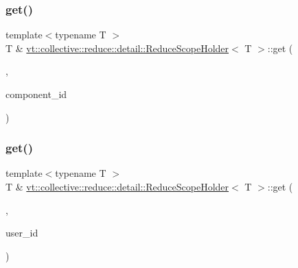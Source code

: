 \mbox{\label{structvt_1_1collective_1_1reduce_1_1detail_1_1_reduce_scope_holder_af25ba6525fc0742740c635d9eaa540de}} 
\subsubsection{\texorpdfstring{get()}{get()}\hspace{0.1cm}{\footnotesize\ttfamily [5/6]}}
{\footnotesize\ttfamily template$<$typename T $>$ \\
T \& \hyperlink{structvt_1_1collective_1_1reduce_1_1detail_1_1_reduce_scope_holder}{vt\+::collective\+::reduce\+::detail\+::\+Reduce\+Scope\+Holder}$<$ T $>$\+::get (\begin{DoxyParamCaption}\item[{\hyperlink{structvt_1_1collective_1_1reduce_1_1detail_1_1_reduce_scope_holder_1_1_component_tag}{Component\+Tag}}]{,  }\item[{\hyperlink{namespacevt_ab6ac935c168b809c422d5121da4f2700}{Component\+I\+D\+Type}}]{component\+\_\+id }\end{DoxyParamCaption})}

\mbox{\label{structvt_1_1collective_1_1reduce_1_1detail_1_1_reduce_scope_holder_a2413b5fd1fbd0b87b09d81240000e5f8}} 
\subsubsection{\texorpdfstring{get()}{get()}\hspace{0.1cm}{\footnotesize\ttfamily [6/6]}}
{\footnotesize\ttfamily template$<$typename T $>$ \\
T \& \hyperlink{structvt_1_1collective_1_1reduce_1_1detail_1_1_reduce_scope_holder}{vt\+::collective\+::reduce\+::detail\+::\+Reduce\+Scope\+Holder}$<$ T $>$\+::get (\begin{DoxyParamCaption}\item[{\hyperlink{structvt_1_1collective_1_1reduce_1_1detail_1_1_reduce_scope_holder_1_1_user_i_d_tag}{User\+I\+D\+Tag}}]{,  }\item[{\hyperlink{namespacevt_1_1collective_1_1reduce_1_1detail_ae82d7b96b0885b9b7dfb0104398beead}{User\+I\+D\+Type}}]{user\+\_\+id }\end{DoxyParamCaption})}

